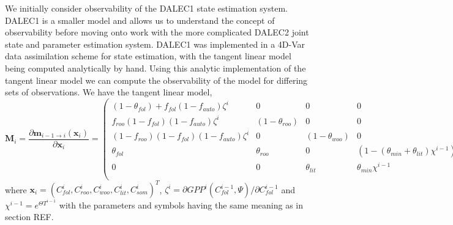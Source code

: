\documentclass[11pt]{article}
\begin{document}
We initially consider observability of the DALEC1 state estimation system. DALEC1 is a smaller model and allows us to understand the concept of observability before moving onto work with the more complicated DALEC2 joint state and parameter estimation system. DALEC1 was implemented in a 4D-Var data assimilation scheme for state estimation, with the tangent linear model being computed analytically by hand. Using this analytic implementation of the tangent linear model we can compute the observability of the model for differing sets of observations. We have the tangent linear model,
\begin{dmath}
\mathbf{M}_{i} = \frac{\partial \textbf{m}_{i-1\rightarrow i}(\textbf{x}_{i})}{\partial \textbf{x}_{i}} = 
\begin{pmatrix}  
(1-\theta_{fol})+f_{fol}(1-f_{auto})\zeta^i & 0 & 0 & 0 & 0 \\
f_{roo}(1-f_{fol})(1-f_{auto})\zeta^i & (1-\theta_{roo}) & 0 & 0 & 0 \\
(1-f_{roo})(1-f_{fol})(1-f_{auto})\zeta^i & 0 & (1-\theta_{woo}) & 0 & 0 \\
\theta_{fol} & \theta_{roo} & 0 & (1-(\theta_{min}+\theta_{lit})\chi^{i-1}) & 0 \\
0 & 0 & \theta_{lit} & \theta_{min}\chi^{i-1} & (1-\theta_{som}\chi^{i-1}) \\
\end{pmatrix}, \label{eqn:linmod}
\end{dmath}
where \(\textbf{x}_{i}=(C_{fol}^{i}, C_{roo}^{i}, C_{woo}^{i}, C_{lit}^{i}, C_{som}^{i})^{T}\), $\zeta^i = \partial GPP^{i}(C_{fol}^{i-1}, \Psi)/\partial C_{fol}^{i-1}$ and $\chi^{i-1}=e^{\Theta T^{i-1}}$ with the parameters and symbols having the same meaning as in section {\color{red} REF}. 
\end{document}
